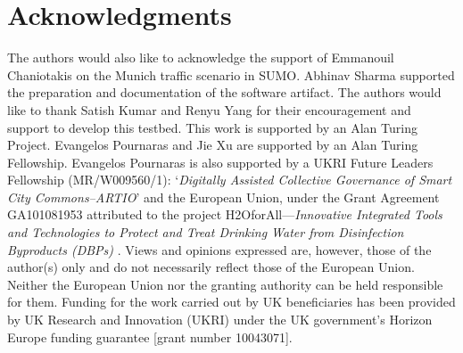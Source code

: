 \documentclass[conference]{IEEEtran}
\begin{document}
\section*{Acknowledgments}
The authors would also like to acknowledge the support of Emmanouil Chaniotakis on the Munich traffic scenario in SUMO. Abhinav Sharma supported the preparation and documentation of the software artifact. The authors would like to thank Satish Kumar and Renyu Yang for their encouragement and support to develop this testbed. This work is supported by an Alan Turing Project. Evangelos Pournaras and Jie Xu are supported by an Alan Turing Fellowship. Evangelos Pournaras is also supported by a UKRI Future Leaders Fellowship (MR\-/W009560\-/1): `\emph{Digitally Assisted Collective Governance of Smart City Commons--ARTIO}' and the European Union, under the Grant Agreement GA101081953 attributed to the project H2OforAll—\emph{Innovative Integrated Tools and Technologies to Protect and Treat Drinking Water from Disinfection Byproducts (DBPs)} . Views and opinions expressed are, however, those of the author(s) only and do not necessarily reflect those of the European Union. Neither the European Union nor the granting authority can be held responsible for them. Funding for the work carried out by UK beneficiaries has been provided by UK Research and Innovation (UKRI) under the UK government’s Horizon Europe funding guarantee [grant number 10043071].



\end{document}
